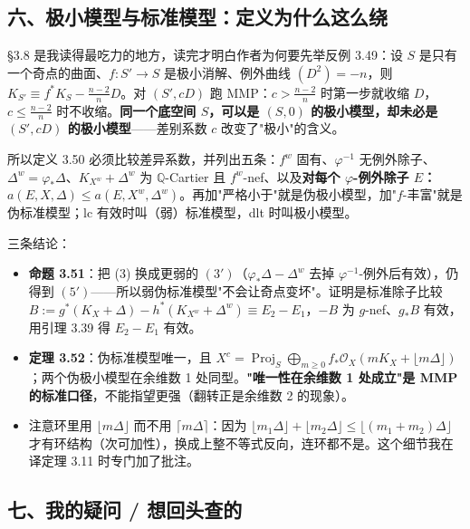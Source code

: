 \subsection*{六、极小模型与标准模型：定义为什么这么绕}

\S3.8 是我读得最吃力的地方，读完才明白作者为何要先举反例 3.49：设 $S$ 是只有一个奇点的曲面、$f:S'\to S$ 是极小消解、例外曲线 $(D^2)=-n$，则 $K_{S'}\equiv f^*K_S-\frac{n-2}{n}D$。对 $(S',cD)$ 跑 MMP：$c>\frac{n-2}{n}$ 时第一步就收缩 $D$，$c\le\frac{n-2}{n}$ 时不收缩。\textbf{同一个底空间 $S$，可以是 $(S,0)$ 的极小模型，却未必是 $(S',cD)$ 的极小模型}——差别系数 $c$ 改变了"极小"的含义。

所以定义 3.50 必须比较差异系数，并列出五条：$f^w$ 固有、$\varphi^{-1}$ 无例外除子、$\Delta^w=\varphi_*\Delta$、$K_{X^w}+\Delta^w$ 为 $\mathbb{Q}$-Cartier 且 $f^w$-nef、以及\textbf{对每个 $\varphi$-例外除子 $E$：$a(E,X,\Delta)\le a(E,X^w,\Delta^w)$}。再加"严格小于"就是伪极小模型，加"$f$-丰富"就是伪标准模型；lc 有效时叫（弱）标准模型，dlt 时叫极小模型。

三条结论：
\begin{itemize}
\item \textbf{命题 3.51}：把 (3) 换成更弱的 $(3')$（$\varphi_*\Delta-\Delta^w$ 去掉 $\varphi^{-1}$-例外后有效），仍得到 $(5')$——所以弱伪标准模型"不会让奇点变坏"。证明是标准除子比较 $B:=g^*(K_X+\Delta)-h^*(K_{X^w}+\Delta^w)\equiv E_2-E_1$，$-B$ 为 $g$-nef、$g_*B$ 有效，用引理 3.39 得 $E_2-E_1$ 有效。
\item \textbf{定理 3.52}：伪标准模型唯一，且 $X^c=\operatorname{Proj}_S\bigoplus_{m\ge0}f_*\mathcal{O}_X(mK_X+\lfloor m\Delta\rfloor)$；两个伪极小模型在余维数 1 处同型。\textbf{"唯一性在余维数 1 处成立"是 MMP 的标准口径}，不能指望更强（翻转正是余维数 2 的现象）。
\item 注意环里用 $\lfloor m\Delta\rfloor$ 而不用 $\lceil m\Delta\rceil$：因为 $\lfloor m_1\Delta\rfloor+\lfloor m_2\Delta\rfloor\le\lfloor(m_1+m_2)\Delta\rfloor$ 才有环结构（次可加性），换成上整不等式反向，连环都不是。这个细节我在译定理 3.11 时专门加了批注。
\end{itemize}

\subsection*{七、我的疑问 / 想回头查的}

